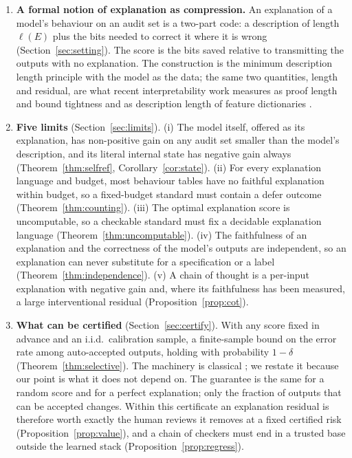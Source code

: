 \documentclass[11pt,letterpaper]{article}
\theoremstyle{plain}
\theoremstyle{definition}
\theoremstyle{remark}
\begin{document}
\begin{enumerate}[leftmargin=1.6em]
\item \textbf{A formal notion of explanation as compression.} An explanation of a model's behaviour on an audit set is a two-part code: a description of length $\ell(E)$ plus the bits needed to correct it where it is wrong (Section~\ref{sec:setting}). The score is the bits saved relative to transmitting the outputs with no explanation. The construction is the minimum description length principle \citep{rissanen1978,grunwald2007} with the model as the data; the same two quantities, length and residual, are what recent interpretability work measures as proof length and bound tightness \citep{gross2024} and as description length of feature dictionaries \citep{ayonrinde2024}.
\item \textbf{Five limits} (Section~\ref{sec:limits}). (i) The model itself, offered as its explanation, has non-positive gain on any audit set smaller than the model's description, and its literal internal state has negative gain always (Theorem~\ref{thm:selfref}, Corollary~\ref{cor:state}). (ii) For every explanation language and budget, most behaviour tables have no faithful explanation within budget, so a fixed-budget standard must contain a defer outcome (Theorem~\ref{thm:counting}). (iii) The optimal explanation score is uncomputable, so a checkable standard must fix a decidable explanation language (Theorem~\ref{thm:uncomputable}). (iv) The faithfulness of an explanation and the correctness of the model's outputs are independent, so an explanation can never substitute for a specification or a label (Theorem~\ref{thm:independence}). (v) A chain of thought is a per-input explanation with negative gain and, where its faithfulness has been measured, a large interventional residual (Proposition~\ref{prop:cot}).
\item \textbf{What can be certified} (Section~\ref{sec:certify}). With any score fixed in advance and an i.i.d.\ calibration sample, a finite-sample bound on the error rate among auto-accepted outputs, holding with probability $1-\delta$ (Theorem~\ref{thm:selective}). The machinery is classical \citep{geifman2017,bates2021rcps,angelopoulos2021ltt}; we restate it because our point is what it does not depend on. The guarantee is the same for a random score and for a perfect explanation; only the fraction of outputs that can be accepted changes. Within this certificate an explanation residual is therefore worth exactly the human reviews it removes at a fixed certified risk (Proposition~\ref{prop:value}), and a chain of checkers must end in a trusted base outside the learned stack (Proposition~\ref{prop:regress}).

\end{enumerate}
\end{document}
